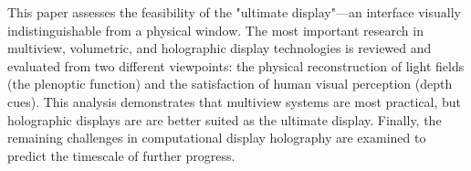 This paper assesses the feasibility of the "ultimate display"—an interface visually indistinguishable from a physical window. The most important research in multiview, volumetric, and holographic display technologies is reviewed and evaluated from two different viewpoints: the physical reconstruction of light fields (the plenoptic function) and the satisfaction of human visual perception (depth cues). This analysis demonstrates that multiview systems are most practical, but holographic displays are are better suited as the ultimate display. Finally, the remaining challenges in computational display holography are examined to predict the timescale of further progress.